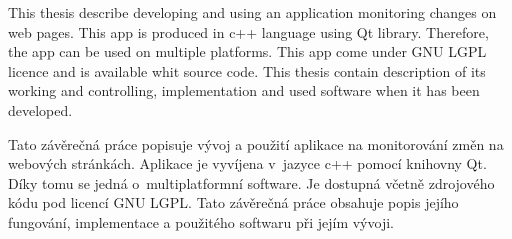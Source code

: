 


\def\obrazek#1#2#3{
	\begin{figure}[tbhp]
  \centering
	{#1}
	\caption{{#2}}
  \label{fig:#3}
\end{figure}
	}
\def\obr#1#2{\obrazek{\texttt{[image: screenshots/\#1.png]}}{#2}{#1}}
\def\obrsize#1#2#3{\obrazek{\texttt{[image: screenshots/\#1.png]}}{#2}{#1}}
\def\,{\penalty10000\hskip.25em}
\pagestyle{headings}

\bakalarska





{This thesis describe developing and using an application monitoring changes on web pages.
This app is produced in c++ language using Qt library. Therefore, the app can be used on multiple platforms.
This app come under GNU LGPL licence and is available whit source code. This thesis contain description of its working and controlling, implementation and used software when it has been developed.}

{Tato závěrečná práce popisuje vývoj a použití aplikace na monitorování změn na webových stránkách.
Aplikace je vyvíjena v~jazyce c++ pomocí knihovny Qt. Díky tomu se jedná o~multiplatformní software.
Je dostupná včetně zdrojového kódu pod licencí GNU LGPL. Tato závěrečná práce obsahuje popis jejího fungování, implementace a použitého softwaru při jejím vývoji.}

\obsah
















